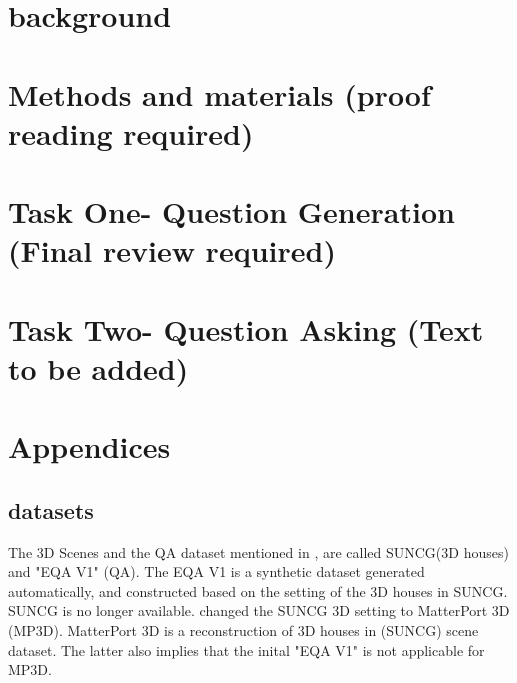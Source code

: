 \documentclass[11pt, a4paper]{article}
\begin{document}



\newpage

\section{background}
\label{sec:background}


\newpage

\section{Methods and materials (proof reading required)}
\label{sec:methods}


\newpage

\section{Task One- Question Generation (Final review required)}
\label{sec:task1}



\section{Task Two- Question Asking (Text to be added)}
\label{sec:task2}





\newpage
\section{Appendices}


\subsection{datasets} 

The 3D Scenes and the QA dataset mentioned in \cite{embodiedqa}, are called SUNCG(3D houses) and "EQA V1" (QA). The EQA V1 is a synthetic dataset generated automatically, and constructed based on the setting of the 3D houses in SUNCG. SUNCG is no longer available. \cite{embodiedqa} changed the SUNCG 3D setting to MatterPort 3D (MP3D). MatterPort 3D is a reconstruction of 3D houses in (SUNCG) scene dataset. The latter also implies that the inital "EQA V1" is not applicable for MP3D. 
\end{document}
